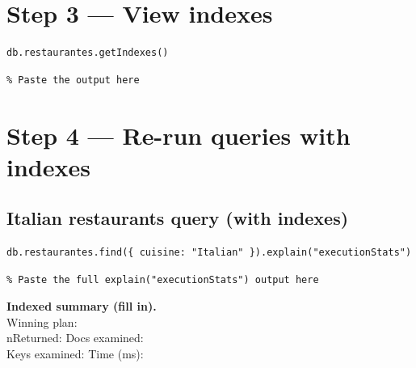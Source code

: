 \documentclass[11pt]{article}
\begin{document}
\section{Step 3 — View indexes}
\begin{cmd}
\begin{verbatim}
db.restaurantes.getIndexes()
\end{verbatim}
\end{cmd}

\begin{out}
\begin{verbatim}
% Paste the output here
\end{verbatim}
\end{out}

\section{Step 4 — Re-run queries with indexes}
\subsection{Italian restaurants query (with indexes)}
\begin{cmd}
\begin{verbatim}
db.restaurantes.find({ cuisine: "Italian" }).explain("executionStats")
\end{verbatim}
\end{cmd}

\begin{out}
\begin{verbatim}
% Paste the full explain("executionStats") output here
\end{verbatim}
\end{out}

\begin{tcolorbox}
\textbf{Indexed summary (fill in).}\\
Winning plan: \underline{\hspace{5.5cm}} \\
nReturned: \underline{\hspace{3.5cm}} \quad
Docs examined: \underline{\hspace{3.5cm}} \\
Keys examined: \underline{\hspace{3.5cm}} \quad
Time (ms): \underline{\hspace{3.5cm}}
\end{tcolorbox}
\end{document}
